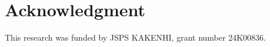 \documentclass[conference]{IEEEtran}
\begin{document}


\section*{Acknowledgment}
\noindent
This research was funded by JSPS KAKENHI, grant number 24K00836.
\printbibliography
\end{document}
